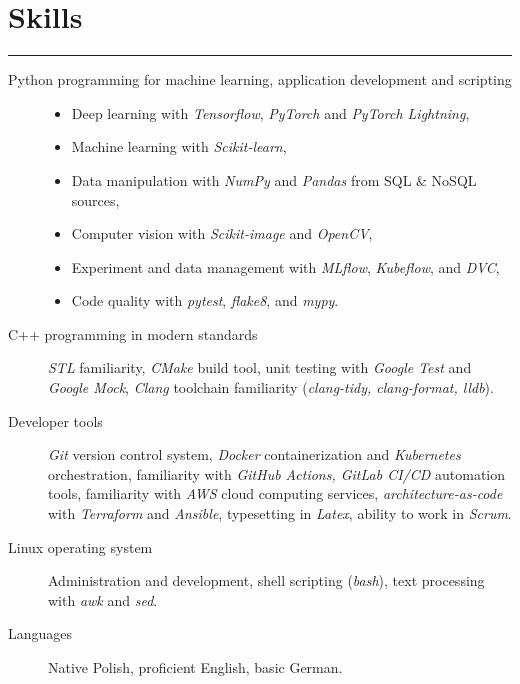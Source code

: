 \documentclass{article}
\begin{document}
\section*{Skills}

\hrule \medskip

{
\begin{description}
	\item[Python programming for machine learning, application development and scripting]
		\begin{itemize}
			\item Deep learning with \textit{Tensorflow}, \textit{PyTorch} and \textit{PyTorch Lightning},
			\item Machine learning with \textit{Scikit-learn},
			\item Data manipulation with \textit{NumPy} and \textit{Pandas} from SQL \& NoSQL sources,
			\item Computer vision with \textit{Scikit-image} and \textit{OpenCV},
			\item Experiment and data management with \textit{MLflow}, \textit{Kubeflow}, and \textit{DVC},
			\item Code quality with \textit{pytest}, \textit{flake8}, and \textit{mypy}.
		\end{itemize}
	\item[C++ programming in modern standards]
		\textit{STL} familiarity,
		\textit{CMake} build tool,
		unit testing with \textit{Google Test} and \textit{Google Mock},
		\textit{Clang} toolchain familiarity (\textit{clang-tidy, clang-format, lldb}).
	\item[Developer tools]
			\textit{Git} version control system,
			\textit{Docker} containerization and \textit{Kubernetes} orchestration,
			familiarity with \textit{GitHub Actions, GitLab CI/CD} automation tools,
			familiarity with \textit{AWS} cloud computing services,
			\textit{architecture-as-code} with \textit{Terraform} and \textit{Ansible}, 
			typesetting in \textit{Latex},
			ability to work in \textit{Scrum}.
	\item[Linux operating system]
		Administration and development,
		shell scripting (\textit{bash}),
		text processing with \textit{awk} and \textit{sed}.
	\item[Languages]
		Native Polish,
		proficient English,
		basic German.
\end{description}
}
\end{document}
